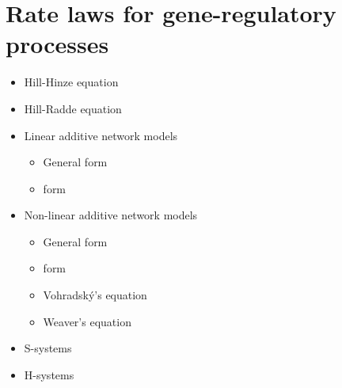 \section{Rate laws for gene-regulatory processes}
\begin{itemize}
  \item Hill-Hinze equation \citep{Hinze2007}
  \item Hill-Radde equation \citep{Radde2007a, Radde2007}
  \item Linear additive network models
    \begin{itemize}
      \item General form
      \item \NetGenerator form \citep{Toepfer2007}
    \end{itemize}
  \item Non-linear additive network models
    \begin{itemize}
      \item General form
      \item \NetGenerator form \citep{Toepfer2007}
      \item Vohradsk{\'y}'s equation \citep{Vu2007}
      \item Weaver's equation \citep{Weaver1999}
    \end{itemize}
  \item S-systems \citep{Savageau1969, spieth04optimizing, Tournier2005, Spieth2006, Hecker2009}
  \item H-systems \citep{Spieth2006}
\end{itemize}

